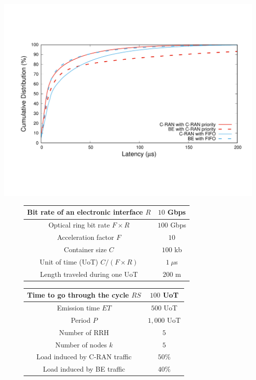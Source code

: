 \documentclass[10pt, conference, letterpaper]{IEEEtran}
\begin{document}
        \begin{center}
      \includegraphics[scale=0.3]{opport.pdf}

         \label{fig:resultopport}
\end{center} 


\begin{figure}[h]
\begin{minipage}[t]{.46\linewidth}
  
  \scalebox{.55}
  {
  \begin{tabular}{|c|c|}
  \hline
  Bit rate of an electronic interface $R$ & $10$ Gbps \tabularnewline
  \hline
  Optical ring bit rate $F\times R$ & $100$ Gbps \tabularnewline
  \hline
    Acceleration factor $F$ & $10$  \tabularnewline
  \hline
  Container size  $C$ & $100$ kb  \tabularnewline
  \hline
  Unit of time (UoT) $C/(F\times R)$ & $1~\mu$s \tabularnewline
  \hline
  Length traveled during one UoT & $200$ m \tabularnewline
  \hline
    \end{tabular}
  }

\end{minipage} %
\begin{minipage}[t]{.46\linewidth}
   \scalebox{.55}
  {
  \begin{tabular}{|c|c|}
  \hline
  Time to go through the cycle $RS$ & $100$ UoT \tabularnewline
  \hline
  Emission time $ET$ & $500$ UoT \tabularnewline
  \hline
   Period $P$ & $1,000$ UoT \tabularnewline
  \hline
  Number of RRH & $5$  \tabularnewline
  \hline
  Number of nodes $k$ & $5$  \tabularnewline
  \hline
   Load induced by C-RAN traffic & $50\%$  \tabularnewline
  \hline
    Load induced by BE traffic & $40\%$  \tabularnewline
  \hline
  \end{tabular}
}
\end{minipage}
  \label{fig:params}
\end{figure}
\end{document}
